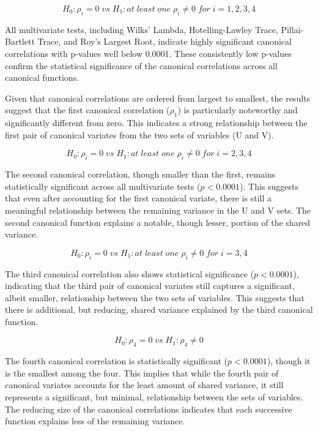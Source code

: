 \documentclass[11pt]{article}
\begin{document}
			\begin{equation}
				H_0 : \rho_i = 0\; vs\; H_1 : at\; least\; one\; \rho_i \neq 0\; for\; i = 1,2,3,4
			\end{equation}
			
			All multivariate tests, including Wilks' Lambda, Hotelling-Lawley Trace, Pillai-Bartlett Trace, and Roy's Largest Root, indicate highly significant canonical correlations with p-values well below 0.0001. These consistently low p-values confirm the statistical significance of the canonical correlations across all canonical functions.
			
			Given that canonical correlations are ordered from largest to smallest, the results suggest that the first canonical correlation ($\rho_1$) is particularly noteworthy and significantly different from zero. This indicates a strong relationship between the first pair of canonical variates from the two sets of variables (U and V).
			
			\begin{equation}
				H_0 : \rho_i = 0\; vs\; H_1 : at\; least\; one\; \rho_i \neq 0\; for\; i = 2,3,4
			\end{equation}
			
			The second canonical correlation, though smaller than the first, remains statistically significant across all multivariate tests ($p < 0.0001$). This suggests that even after accounting for the first canonical variate, there is still a meaningful relationship between the remaining variance in the U and V sets. The second canonical function explains a notable, though lesser, portion of the shared variance.
			
			\begin{equation}
				H_0 : \rho_i = 0\; vs\; H_1 : at\; least\; one\; \rho_i \neq 0\; for\; i = 3,4
			\end{equation}
			
			The third canonical correlation also shows statistical significance ($p < 0.0001$), indicating that the third pair of canonical variates still captures a significant, albeit smaller, relationship between the two sets of variables. This suggests that there is additional, but reducing, shared variance explained by the third canonical function.
			
			\begin{equation}
				H_0 : \rho_4 = 0\; vs\; H_1 : \rho_4 \neq 0
			\end{equation}
			
			The fourth canonical correlation is statistically significant ($p < 0.0001$), though it is the smallest among the four. This implies that while the fourth pair of canonical variates accounts for the least amount of shared variance, it still represents a significant, but minimal, relationship between the sets of variables. The reducing size of the canonical correlations indicates that each successive function explains less of the remaining variance.
			
\end{document}
